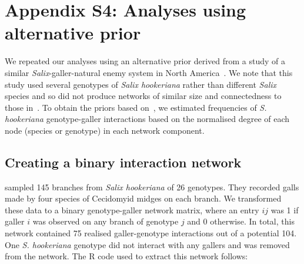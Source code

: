 \documentclass[12pt]{article}
\begin{document}


\clearpage

\section*{Appendix S4: Analyses using alternative prior}

  We repeated our analyses using an alternative prior derived from a study of a similar \emph{Salix}-galler-natural enemy system in North America~\citep{Barbour2016,Barbour2016Dryad}. We note that this study used several genotypes of \emph{Salix hookeriana} rather than different \emph{Salix} species and so did not produce networks of similar size and connectedness to those in~\citep{Kopelke2017}.  To obtain the priors based on~\citet{Barbour2016}, we estimated frequencies of  \emph{S. hookeriana} genotype-galler interactions based on the normalised degree of each node (species or genotype) in each network component.

    \subsection*{Creating a binary interaction network}

      \citet{Barbour2016,Barbour2016Dryad} sampled 145 branches from 
      \emph{Salix hookeriana} of 26 genotypes. They recorded galls 
      made by four species of Cecidomyid midges on each branch. We 
      transformed these data to a binary genotype-galler network 
      matrix, where an entry $ij$ was 1 if galler $i$ was observed 
      on any branch of genotype $j$ and 0 otherwise. In total, this 
      network contained 75 realised galler-genotype interactions 
      out of a potential 104. One \emph{S. hookeriana} genotype did
      not interact with any gallers and was removed from the network.
      The R code used to extract this 
      network follows:
\end{document}

